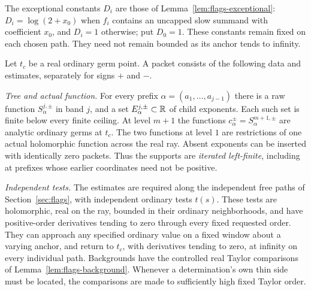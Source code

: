 The exceptional constants $D_i$ are those of
Lemma~\ref{lem:flags-exceptional}: $D_i=\log(2+x_0)$ when $f_i$
contains an uncapped slow summand with coefficient $x_0$, and $D_i=1$
otherwise; put $D_0=1$.  These constants remain fixed on each chosen
path.  They need not remain bounded as its anchor tends to infinity.

\begin{definition}\label{def:packet}
Let $t_c$ be a real ordinary germ point.  A packet consists of the
following data and estimates, separately for signs $+$ and $-$.

\emph{Tree and actual function.}
For every prefix $\alpha=(a_1,\ldots,a_{j-1})$ there is a raw
function $S^{j,\pm}_{\alpha}$ in band $j$, and a set
$E^{j,\pm}_{\alpha}\subset\mathbb{R}$ of child exponents.  Each such set
is finite below every finite ceiling.  At level $m+1$ the functions
$c^{\pm}_\alpha=S^{m+1,\pm}_\alpha$ are analytic ordinary germs
at $t_c$.  The two functions at level $1$ are restrictions of one
actual holomorphic function across the real ray.  Absent exponents
can be inserted with identically zero packets.  Thus the supports
are \emph{iterated left-finite}, including at prefixes whose earlier
coordinates need not be positive.

\emph{Independent tests.}
The estimates are required along the independent free paths of
Section~\ref{sec:flags}, with independent ordinary tests $t(s)$.
These tests are holomorphic, real on the ray, bounded in their
ordinary neighborhoods, and have positive-order derivatives tending
to zero through every fixed requested order.  They can approach any
specified ordinary value on a fixed window about a varying anchor,
and return to $t_c$, with derivatives tending to zero, at infinity
on every individual path.  Backgrounds have the controlled real
Taylor comparisons of Lemma~\ref{lem:flags-background}.  Whenever
a determination's own thin side must be located, the comparisons
are made to sufficiently high fixed Taylor order.


\end{definition}
